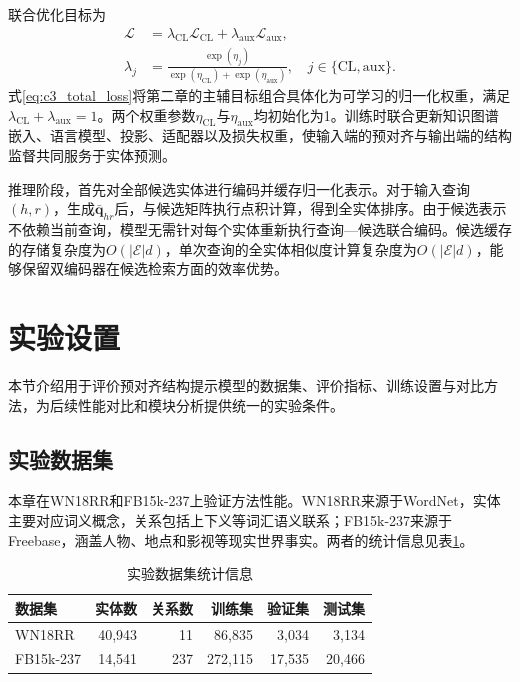 联合优化目标为
\begin{equation}
\begin{aligned}
    \mathcal{L}&=\lambda_{\mathrm{CL}}\mathcal{L}_{\mathrm{CL}}
                   +\lambda_{\mathrm{aux}}\mathcal{L}_{\mathrm{aux}},\\
    \lambda_j&=\frac{\exp(\eta_j)}{\exp(\eta_{\mathrm{CL}})+\exp(\eta_{\mathrm{aux}})},
        \quad j\in\{\mathrm{CL},\mathrm{aux}\}.
\end{aligned}
    \label{eq:c3_total_loss}
\end{equation}
式\eqref{eq:c3_total_loss}将第二章的主辅目标组合具体化为可学习的归一化权重，满足$\lambda_{\mathrm{CL}}+\lambda_{\mathrm{aux}}=1$。两个权重参数$\eta_{\mathrm{CL}}$与$\eta_{\mathrm{aux}}$均初始化为1。训练时联合更新知识图谱嵌入、语言模型、投影、适配器以及损失权重，使输入端的预对齐与输出端的结构监督共同服务于实体预测。

推理阶段，首先对全部候选实体进行编码并缓存归一化表示。对于输入查询$(h,r)$，生成$\bar{\mathbf{q}}_{hr}$后，与候选矩阵执行点积计算，得到全实体排序。由于候选表示不依赖当前查询，模型无需针对每个实体重新执行查询—候选联合编码。候选缓存的存储复杂度为$O(|\mathcal{E}|d)$，单次查询的全实体相似度计算复杂度为$O(|\mathcal{E}|d)$，能够保留双编码器在候选检索方面的效率优势。

\section{实验设置}

本节介绍用于评价预对齐结构提示模型的数据集、评价指标、训练设置与对比方法，为后续性能对比和模块分析提供统一的实验条件。

\subsection{实验数据集}

本章在WN18RR和FB15k-237上验证方法性能。WN18RR来源于WordNet，实体主要对应词义概念，关系包括上下义等词汇语义联系；FB15k-237来源于Freebase，涵盖人物、地点和影视等现实世界事实\cite{dettmers2018conve,toutanova2015observed}。两者的统计信息见表\ref{tab:c3_datasets}。

\begin{table}[!htbp]
\centering
{}
\caption{实验数据集统计信息}
\label{tab:c3_datasets}
\small
\begin{tabular}{lrrrrr}
\toprule
数据集 & 实体数 & 关系数 & 训练集 & 验证集 & 测试集\\
\midrule
WN18RR & 40,943 & 11 & 86,835 & 3,034 & 3,134\\
FB15k-237 & 14,541 & 237 & 272,115 & 17,535 & 20,466\\
\bottomrule
\end{tabular}
\end{table}

